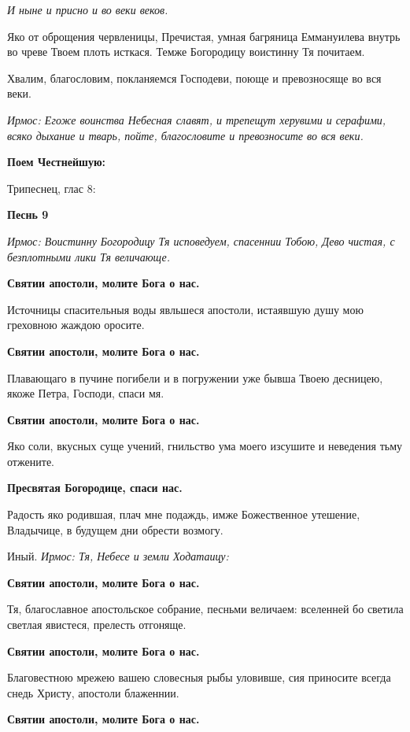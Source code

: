 \itshape И ныне\normalfont{} и присно и во веки веков.


Яко от оброщения червленицы, Пречистая, умная багряница Еммануилева внутрь во чреве Твоем плоть исткася. Темже Богородицу воистинну Тя почитаем.


Хвалим, благословим, покланяемся Господеви, поюще и превозносяще во вся веки.


\itshape Ирмос\normalfont{}: Егоже воинства Небесная славят, и трепещут херувими и серафими, всяко дыхание и тварь, пойте, благословите и превозносите во вся веки. 

\medskip
\bfseries Поем Честнейшую:


Трипеснец, глас 8:\normalfont{}


\medskip
\bfseries Песнь 9\normalfont{}


\itshape Ирмос\normalfont{}: Воистинну Богородицу Тя исповедуем, спасеннии Тобою, Дево чистая, с безплотными лики Тя величающе.


\bfseries Святии апостоли, молите Бога о нас.\normalfont{}


Источницы спасительныя воды явльшеся апостоли, истаявшую душу мою греховною жаждою оросите.


\bfseries Святии апостоли, молите Бога о нас.\normalfont{}


Плавающаго в пучине погибели и в погружении уже бывша Твоею десницею, якоже Петра, Господи, спаси мя.


\bfseries Святии апостоли, молите Бога о нас.\normalfont{}


Яко соли, вкусных суще учений, гнильство ума моего изсушите и неведения тьму отжените.


\bfseries Пресвятая Богородице, спаси нас.\normalfont{}


Радость яко родившая, плач мне подаждь, имже Божественное утешение, Владычице, в будущем дни обрести возмогу.


Иный. \itshape Ирмос\normalfont{}: Тя, Небесе и земли Ходатаицу:

\bfseries Святии апостоли, молите Бога о нас.\normalfont{}


Тя, благославное апостольское собрание, песньми величаем: вселенней бо светила светлая явистеся, прелесть отгоняще.


\bfseries Святии апостоли, молите Бога о нас.\normalfont{}


Благовестною мрежею вашею словесныя рыбы уловивше, сия приносите всегда снедь Христу, апостоли блаженнии.

\bfseries Святии апостоли, молите Бога о нас.\normalfont{}


